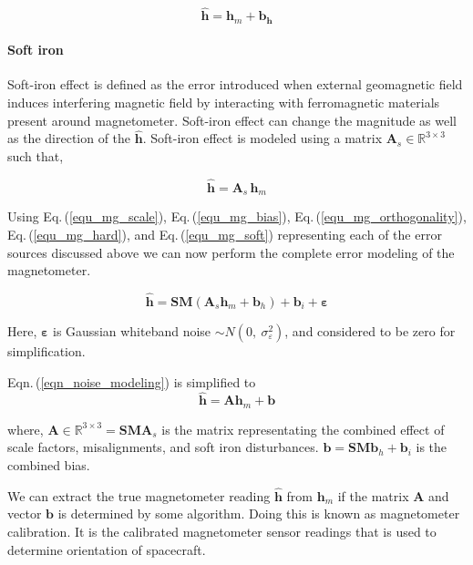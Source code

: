 \documentclass[10pt, a4paper]{article}
\begin{document}
\begin{equation}
\hat{\bm{h}} = \bm{h}_{m} + \bm{b_{h}}
\end{equation}

\paragraph*{Soft iron} \label{equ_mg_soft}
Soft-iron effect is defined as the error introduced when external geomagnetic field induces interfering magnetic field by interacting with ferromagnetic materials present around magnetometer. Soft-iron effect can change the magnitude as well as the direction of the $\hat{\bm{h}}$. Soft-iron effect is modeled using a matrix $\bm{A}_{s} \in \mathbb{R}^{3\times3}$ such that,

\begin{equation}
\hat{\bm{h}} = \bm{A}_{s} \, \bm{h}_{m}
\end{equation}

Using Eq.\,(\ref{equ_mg_scale}), Eq.\,(\ref{equ_mg_bias}), Eq.\,(\ref{equ_mg_orthogonality}), Eq.\,(\ref{equ_mg_hard}), and Eq.\,(\ref{equ_mg_soft}) representing each of the error sources discussed above we can now perform the complete error modeling of the magnetometer.

\begin{equation} \label{eqn_noise_modeling}
\hat{\bm{h}} = \bm{S}\bm{M}(\bm{A}_{s}\bm{h}_{m} + \bm{b}_{h}) + \bm{b}_{i} + \bm{\varepsilon}
\end{equation}

Here, $\bm{\varepsilon}$ is Gaussian whiteband noise $ \sim N(0, \: \sigma^{2}_{\varepsilon})$, and considered to be zero for simplification.

Eqn.\,(\ref{eqn_noise_modeling}) is simplified to
\begin{equation} \label{eqn_final_error}
\hat{\bm{h}} = \bm{A}\bm{h}_{m} + \bm{b}
\end{equation}

where,
$ \bm{A} \in \mathbb{R}^{3\times3} = \bm{S}\bm{M}\bm{A}_{s}$ is the matrix representating the combined effect of scale factors, misalignments, and soft iron disturbances. $\bm{b} = \bm{S}\bm{M}\bm{b}_{h} + \bm{b}_{i}$ is the combined bias.

We can extract the true magnetometer reading $\hat{\bm{h}}$ from  $\bm{h}_m$ if the matrix $\bm{A}$ and vector $\bm{b}$ is determined by some algorithm. Doing this is known as magnetometer calibration. It is the calibrated magnetometer sensor readings that is used to determine orientation of spacecraft.
\end{document}
